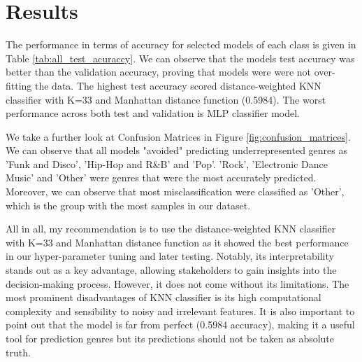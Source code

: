\documentclass{assignment}
\begin{document}
\section{Results}

The performance in terms of accuracy for selected models of each class is given in Table \ref{tab:all_test_acuraccy}. We can observe that the models test accuracy was better than the validation accuracy, proving that models were were not over-fitting the data. The highest test accuracy scored distance-weighted KNN classifier with K=33 and Manhattan distance function (0.5984). The worst performance across both test and validation is MLP classifier model.

\smallskip

We take a further look at Confusion Matrices in Figure \ref{fig:confusion_matrices}. We can observe that all models "avoided" predicting underrepresented genres as 'Funk and Disco', 'Hip-Hop and R\&B' and 'Pop'. 'Rock', 'Electronic Dance Music' and 'Other' were genres that were the most accurately predicted. Moreover, we can observe that most misclassification were classified as 'Other', which is the group with the most samples in our dataset. 

\smallskip

All in all, my recommendation is to use the distance-weighted KNN classifier with K=33 and Manhattan distance function as it showed the best performance in our hyper-parameter tuning and later testing. Notably, its interpretability stands out as a key advantage, allowing stakeholders to gain insights into the decision-making process. However, it does not come without its limitations. The most prominent disadvantages of KNN classifier is its high computational complexity and sensibility to noisy and irrelevant features. It is also important to point out that the model is far from perfect (0.5984 accuracy), making it a useful tool for prediction genres but its predictions should not be taken as absolute truth. 



\bigskip
\end{document}
